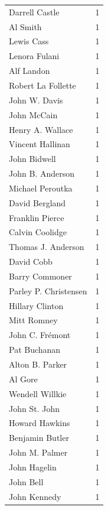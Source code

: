 \documentclass[
  letterpaper,
  DIV=11,
  numbers=noendperiod]{scrreprt}
\begin{document}
\begin{tabular}{lr}
Darrell Castle         &          1 \\
Al Smith               &          1 \\
Lewis Cass             &          1 \\
Lenora Fulani          &          1 \\
Alf Landon             &          1 \\
Robert La Follette     &          1 \\
John W. Davis          &          1 \\
John McCain            &          1 \\
Henry A. Wallace       &          1 \\
Vincent Hallinan       &          1 \\
John Bidwell           &          1 \\
John B. Anderson       &          1 \\
Michael Peroutka       &          1 \\
David Bergland         &          1 \\
Franklin Pierce        &          1 \\
Calvin Coolidge        &          1 \\
Thomas J. Anderson     &          1 \\
David Cobb             &          1 \\
Barry Commoner         &          1 \\
Parley P. Christensen  &          1 \\
Hillary Clinton        &          1 \\
Mitt Romney            &          1 \\
John C. Frémont        &          1 \\
Pat Buchanan           &          1 \\
Alton B. Parker        &          1 \\
Al Gore                &          1 \\
Wendell Willkie        &          1 \\
John St. John          &          1 \\
Howard Hawkins         &          1 \\
Benjamin Butler        &          1 \\
John M. Palmer         &          1 \\
John Hagelin           &          1 \\
John Bell              &          1 \\
John Kennedy           &          1 \\
\bottomrule
\end{tabular}
\end{document}
